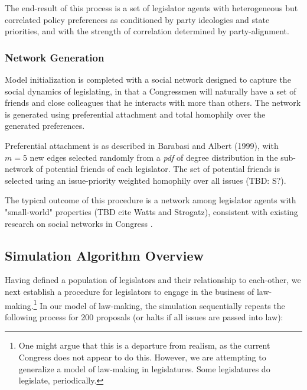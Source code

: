 \documentclass[pdftex,12pt]{llncs}
\begin{document}
The end-result of this process is a set of legislator agents with heterogeneous but correlated policy preferences as conditioned by party ideologies and state priorities, and with the strength of correlation determined by party-alignment.

\subsubsection{Network Generation}
Model initialization is completed with a social network designed to capture the social dynamics of legislating, in that a Congressmen will naturally have a set of friends and close colleagues that he interacts with more than others. 
The network is generated using preferential attachment and total homophily over the generated preferences.
 
Preferential attachment is as described in Barabasi and Albert (1999), with $m=5$ new edges selected randomly from a \textit{pdf} of degree distribution in the sub-network of potential friends of each legislator. 
The set of potential friends is selected using an issue-priority weighted homophily over all issues (TBD: S?).

The typical outcome of this procedure is a network among legislator agents with "small-world" properties (TBD cite Watts and Strogatz), consistent with existing research on social networks in Congress \parencite{Granovetter1978}.

\subsection{Simulation Algorithm Overview}
Having defined a population of legislators and their relationship to each-other, we next establish a procedure for legislators to engage in the business of law-making.\footnote{One might argue that this is a departure from realism, as the current Congress does not appear to do this.
However, we are attempting to generalize a model of law-making in legislatures.
Some legislatures do legislate, periodically.}
In our model of law-making, the simulation sequentially repeats the following process for 200 proposals (or halts if all issues are passed into law):
\end{document}
